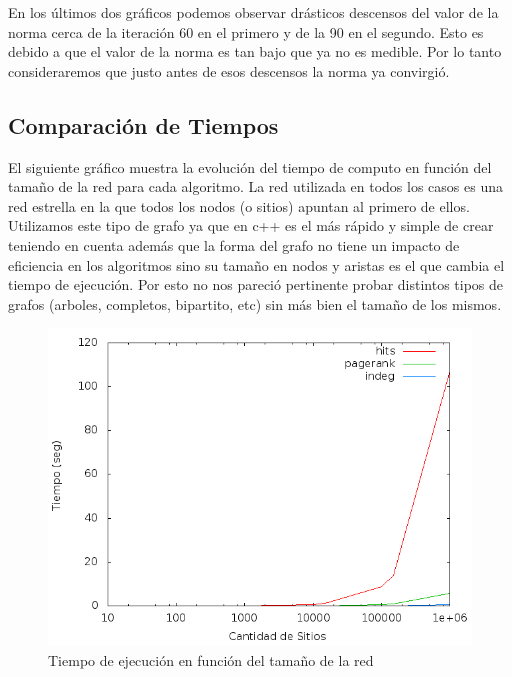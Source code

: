 En los últimos dos gráficos podemos observar drásticos descensos del valor de la norma cerca de la iteración 60 en el primero y de la 90 en el segundo. Esto es debido a que el valor de la norma es tan bajo que ya no es medible. Por lo tanto consideraremos que justo antes de esos descensos la norma ya convirgió.

\clearpage

\subsection{Comparación de Tiempos}

El siguiente gráfico muestra la evolución del tiempo de computo en función del tamaño de la red para cada algoritmo. La red utilizada en todos los casos es una red estrella en la que todos los nodos (o sitios) apuntan al primero de ellos. Utilizamos este tipo de grafo ya que en c++ es el más rápido y simple de crear teniendo en cuenta además que la forma del grafo no tiene un impacto de eficiencia en los algoritmos sino su tamaño en nodos y aristas es el que cambia el tiempo de ejecución. Por esto no nos pareció pertinente probar distintos tipos de grafos (arboles, completos, bipartito, etc) sin más bien el tamaño de los mismos.

 \begin{figure}[!htb]
\begin{center}
    \includegraphics[scale=0.5]{imagenes/Tiempos.png}
    \caption{Tiempo de ejecución en función del tamaño de la red}
    \end{center}
\end{figure}



